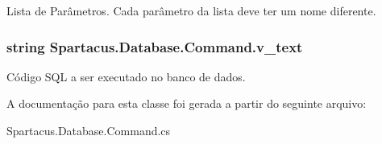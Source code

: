 Lista de Parâmetros. Cada parâmetro da lista deve ter um nome diferente. 

\hypertarget{classSpartacus_1_1Database_1_1Command_aac557f84f3e833295d59632f0961311e}{
\subsubsection[{v\+\_\+text}]{\setlength{\rightskip}{0pt plus 5cm}string Spartacus.\+Database.\+Command.\+v\+\_\+text}}\label{classSpartacus_1_1Database_1_1Command_aac557f84f3e833295d59632f0961311e}


Código S\+Q\+L a ser executado no banco de dados. 



A documentação para esta classe foi gerada a partir do seguinte arquivo\+:\begin{DoxyCompactItemize}
\item 
Spartacus.\+Database.\+Command.\+cs\end{DoxyCompactItemize}
